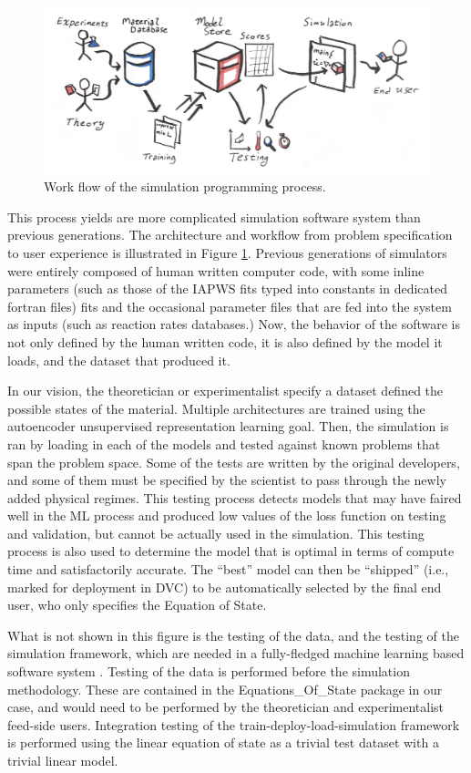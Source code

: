 \documentclass[]{article}
\begin{document}
\begin{figure}
  \centering
  \includegraphics[width=6in]{../slides/user_workflow.png}
  \caption{\label{fig:workflow}Work flow of the simulation programming process.}
\end{figure}
This process yields are more complicated simulation software system
than previous generations. The architecture and workflow from problem
specification to user experience is illustrated in Figure
\ref{fig:workflow}.
Previous generations of simulators were entirely composed of human
written computer code, with some inline parameters (such as those of
the IAPWS fits typed into constants in dedicated fortran files)
fits and the occasional parameter files that are fed into the system
as inputs (such as reaction rates databases.)
Now, the behavior of the software is not only defined by the human
written code, it is also defined by the model it loads, and the
dataset that produced it.

In our vision, the theoretician or experimentalist specify a dataset
defined the possible states of the material. Multiple architectures
are trained using the autoencoder unsupervised representation learning
goal. Then, the simulation is ran by loading in each of the models and tested against known problems that
span the problem space. Some of the tests are written by the original
developers, and some of them must be specified by the scientist to
pass through the newly added physical regimes.
This testing process detects models that may have faired well in the
ML process and produced low values of the loss function on testing and
validation, but cannot be actually used in the simulation.
This testing process is also used to determine the model that is
optimal in terms of compute time and satisfactorily accurate.
The ``best'' model can then be ``shipped'' (i.e., marked for
deployment in DVC) to be automatically selected by the final end user,
who only specifies the Equation of State.

What is not shown in this figure is the testing of the data, and the
testing of the simulation framework, which are needed in a
fully-fledged machine learning based software system \cite{google ML smells}.
Testing of the data is performed before the simulation
methodology. These are contained in the Equations\_Of\_State package in our case, and would
need to be performed by the theoretician and experimentalist feed-side
users.
Integration testing of the train-deploy-load-simulation framework is
performed using the linear equation of state as a trivial test dataset
with a trivial linear model. 
\end{document}
